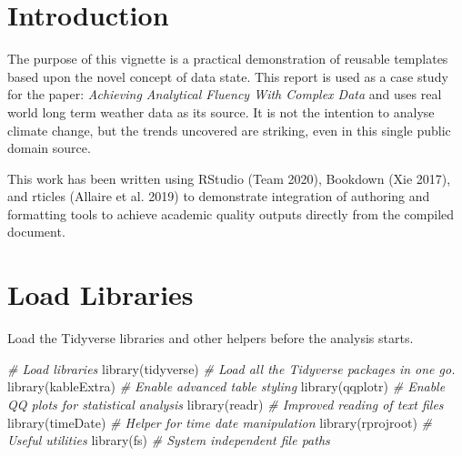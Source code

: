 \documentclass{article}
\title{\myTitleMainTitle}
\author{
    Dr Paul J. Palmer
   \\
    Wolfson School of Mechanical, Electrical and Manufacturing Engineering \\
    Loughborough University \\
  Leicestershire VC55 \\
  \texttt{\href{mailto:p.j.palmer@lboro.ac.uk}{\nolinkurl{p.j.palmer@lboro.ac.uk}}} \\
  }
\newenvironment{Shaded}{\begin{snugshade}}{\end{snugshade}}
\newcommand{\CommentTok}[1]{\textcolor[rgb]{0.56,0.35,0.01}{\textit{#1}}}
\newcommand{\FunctionTok}[1]{\textcolor[rgb]{0.00,0.00,0.00}{#1}}
\newcommand{\NormalTok}[1]{#1}
\begin{document}
\maketitle


\begin{abstract}
\myAbstract
\end{abstract}


\hypertarget{introduction}{%
\section{Introduction}\label{introduction}}

The purpose of this vignette is a practical demonstration of reusable templates based upon the novel concept of data state. This report is used as a case study for the paper: \emph{Achieving Analytical Fluency With Complex Data} and uses real world long term weather data as its source. It is not the intention to analyse climate change, but the trends uncovered are striking, even in this single public domain source.

This work has been written using RStudio (Team 2020), Bookdown (Xie 2017), and rticles (Allaire et al. 2019) to demonstrate integration of authoring and formatting tools to achieve academic quality outputs directly from the compiled document.

\hypertarget{load-libraries}{%
\section{Load Libraries}\label{load-libraries}}

Load the Tidyverse libraries and other helpers before the analysis starts.

\begin{Shaded}
\begin{Highlighting}[]
\CommentTok{\# Load libraries}
\FunctionTok{library}\NormalTok{(tidyverse) }\CommentTok{\# Load all the Tidyverse packages in one go.}
\FunctionTok{library}\NormalTok{(kableExtra) }\CommentTok{\# Enable advanced table styling}
\FunctionTok{library}\NormalTok{(qqplotr) }\CommentTok{\# Enable QQ plots for statistical analysis}
\FunctionTok{library}\NormalTok{(readr) }\CommentTok{\# Improved reading of text files}
\FunctionTok{library}\NormalTok{(timeDate) }\CommentTok{\# Helper for time date manipulation}
\FunctionTok{library}\NormalTok{(rprojroot) }\CommentTok{\# Useful utilities}
\FunctionTok{library}\NormalTok{(fs) }\CommentTok{\# System independent file paths}
\end{Highlighting}
\end{Shaded}
\end{document}
